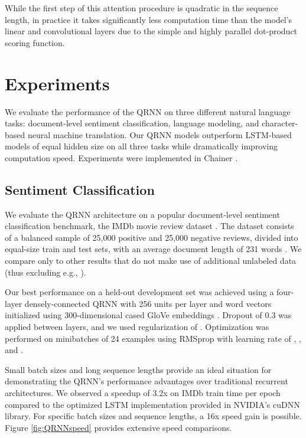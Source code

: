 \documentclass{article} \usepackage{iclr2017_conference,times}
\begin{document}
While the first step of this attention procedure is quadratic in the sequence length, in practice it takes significantly less computation time than the model's linear and convolutional layers due to the simple and highly parallel dot-product scoring function.

\section{Experiments}
We evaluate the performance of the QRNN on three different natural language tasks: document-level sentiment classification, language modeling, and character-based neural machine translation. Our QRNN models outperform LSTM-based models of equal hidden size on all three tasks while dramatically improving computation speed. Experiments were implemented in Chainer \citep{Tokui2015}.

\subsection{Sentiment Classification}

We evaluate the QRNN architecture on a popular document-level sentiment classification benchmark, the IMDb movie review dataset \citep{Maas2011}. The dataset consists of a balanced sample of 25,000 positive and 25,000 negative reviews, divided into equal-size train and test sets, with an average document length of 231 words \citep{Wang2012}. We compare only to other results that do not make use of additional unlabeled data (thus excluding e.g., \citet{Miyato2016}).

Our best performance on a held-out development set was achieved using a four-layer densely-connected QRNN with 256 units per layer and word vectors initialized using 300-dimensional cased GloVe embeddings \citep{Pennington2014}. Dropout of 0.3 was applied between layers, and we used  regularization of .
Optimization was performed on minibatches of 24 examples using RMSprop \citep{Tieleman2012} with learning rate of , , and .

Small batch sizes and long sequence lengths provide an ideal situation for demonstrating the QRNN's performance advantages over traditional recurrent architectures.
We observed a speedup of 3.2x on IMDb train time per epoch compared to the optimized LSTM implementation provided in NVIDIA's cuDNN library.
For specific batch sizes and sequence lengths, a 16x speed gain is possible.
Figure \ref{fig:QRNNspeed} provides extensive speed comparisons.
\end{document}
